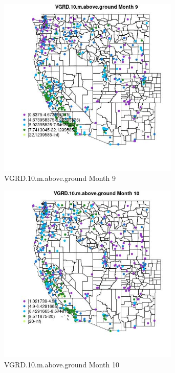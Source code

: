 \begin{figure} 
\centering  
\includegraphics[width=0.77\textwidth]{Code_Outputs/ML_input_report_ML_input_PM25_Step5_part_d_de_duplicated_aves_ML_input_MapObsMo9VGRD10maboveground.jpg} 
\caption{\label{fig:ML_input_report_ML_input_PM25_Step5_part_d_de_duplicated_aves_ML_inputMapObsMo9VGRD10maboveground}VGRD.10.m.above.ground Month 9} 
\end{figure} 
 

\begin{figure} 
\centering  
\includegraphics[width=0.77\textwidth]{Code_Outputs/ML_input_report_ML_input_PM25_Step5_part_d_de_duplicated_aves_ML_input_MapObsMo10VGRD10maboveground.jpg} 
\caption{\label{fig:ML_input_report_ML_input_PM25_Step5_part_d_de_duplicated_aves_ML_inputMapObsMo10VGRD10maboveground}VGRD.10.m.above.ground Month 10} 
\end{figure} 
 

